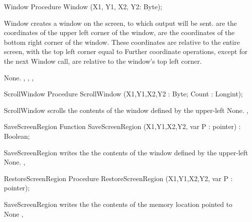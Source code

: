  \html{}
\begin{procedure}{Window}
\Declaration
Procedure Window (X1, Y1, X2, Y2: Byte);

\Description
 Window creates a window on the screen, to which output will be sent.
 are the coordinates of the upper left corner of the window,
 are the coordinates of the bottom right corner of the window.
These coordinates are relative to the entire screen, with the top left
corner equal to 
Further coordinate operations, except for the next Window call,
are relative to the window's top left corner.

\Errors
None.
\SeeAlso
{}, , , 
\end{procedure}
\html{}
\begin{procedure}{ScrollWindow}
\Declaration
Procedure ScrollWindow (X1,Y1,X2,Y2 : Byte; Count : Longint);

\Description
 ScrollWindow scrolls the contents of the window defined by the upper-left
%
\Errors
None.
\SeeAlso
{}, 
\end{procedure}
\begin{function}{SaveScreenRegion}
\Declaration
Function SaveScreenRegion (X1,Y1,X2,Y2, var P : pointer) : Boolean;

\Description
SaveScreenRegion writes the the contents of the window defined by the upper-left
%
%
\Errors
None.
\SeeAlso
{},  
\end{function}
\begin{procedure}{RestoreScreenRegion}
\Declaration
Procedure RestoreScreenRegion (X1,Y1,X2,Y2, var P : pointer);

\Description
SaveScreenRegion writes the the contents of the memory location pointed to
%
%
\Errors
None
\SeeAlso
{},  
\end{procedure}

